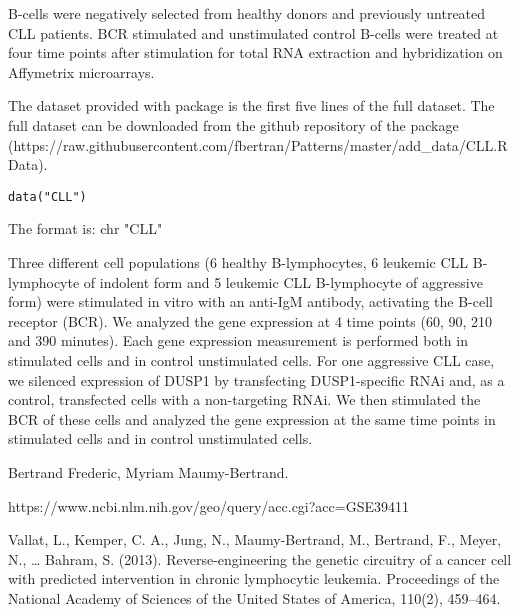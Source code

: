 \documentclass[a4paper]{book}
\begin{document}
%
\begin{Description}\relax
B-cells were negatively selected from healthy donors and previously untreated CLL patients. BCR stimulated and unstimulated control B-cells were treated at four time points after stimulation for total RNA extraction and hybridization on Affymetrix microarrays.

The dataset provided with package is the first five lines of the full dataset. The full dataset can be downloaded from the github repository of the package (https://raw.githubusercontent.com/fbertran/Patterns/master/add\_data/CLL.RData).
\end{Description}
%
\begin{Usage}
\begin{verbatim}
data("CLL")
\end{verbatim}
\end{Usage}
%
\begin{Format}
The format is:
chr "CLL"
\end{Format}
%
\begin{Details}\relax
Three different cell populations (6 healthy B-lymphocytes, 6 leukemic CLL B-lymphocyte of indolent form and 5 leukemic CLL B-lymphocyte of aggressive form) were stimulated in vitro with an anti-IgM antibody, activating the B-cell receptor (BCR). We analyzed the gene expression at 4 time points (60, 90, 210 and 390 minutes). Each gene expression measurement is performed both in stimulated cells and in control unstimulated cells.
For one aggressive CLL case, we silenced expression of DUSP1 by transfecting DUSP1-specific RNAi and, as a control, transfected cells with a non-targeting RNAi. We then stimulated the BCR of these cells and analyzed the gene expression at the same time points in stimulated cells and in control unstimulated cells.
\end{Details}
%
\begin{Author}\relax
Bertrand Frederic, Myriam Maumy-Bertrand.
\end{Author}
%
\begin{Source}\relax
https://www.ncbi.nlm.nih.gov/geo/query/acc.cgi?acc=GSE39411
\end{Source}
%
\begin{References}\relax
Vallat, L., Kemper, C. A., Jung, N., Maumy-Bertrand, M., Bertrand, F., Meyer, N., … Bahram, S. (2013). Reverse-engineering the genetic circuitry of a cancer cell with predicted intervention in chronic lymphocytic leukemia. Proceedings of the National Academy of Sciences of the United States of America, 110(2), 459–464. 
\end{References}
\end{document}
